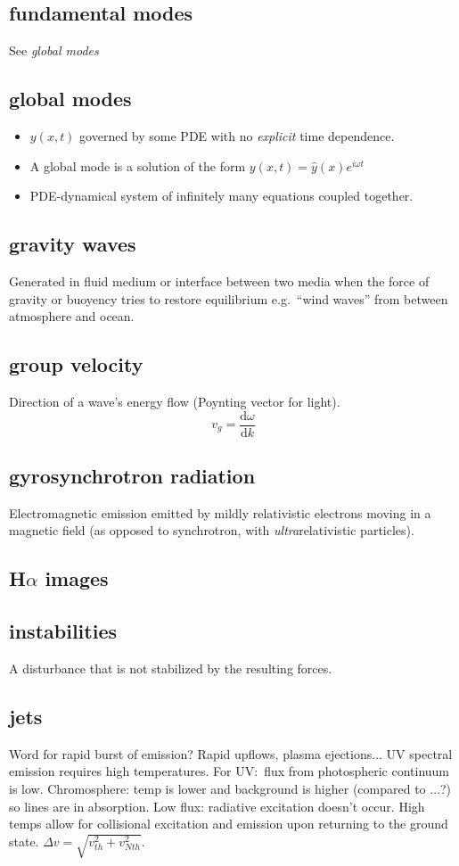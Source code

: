 \documentclass{article}
\begin{document}
\subsection{fundamental modes}
See \emph{global modes}

\subsection{global modes}
\begin{itemize}
    \item $y(x,t)$ governed by some PDE with no \emph{explicit} time dependence.
    \item A global mode is a solution of the form
        $y(x,t) = \hat{y}(x)e^{i\omega t}$
    \item PDE-dynamical system of infinitely many equations coupled together.
\end{itemize}

\subsection{gravity waves}
Generated in fluid medium or interface between two media when the
force of gravity or buoyency tries to restore equilibrium
e.g.\ ``wind waves'' from between atmosphere and ocean.

\subsection{group velocity}
Direction of a wave's energy flow (Poynting vector for light).
\[
    v_{g} = \frac{ \mathrm{d}\omega }{ \mathrm{d}k }
    \]

\subsection{gyrosynchrotron radiation}
Electromagnetic emission emitted by mildly relativistic electrons moving
in a magnetic field
(as opposed to synchrotron, with \emph{ultra}relativistic particles).
\subsection{H$\alpha$ images}
\subsection{instabilities}
A disturbance that is not stabilized by the resulting forces.

\subsection{jets}
Word for rapid burst of emission? Rapid upflows, plasma
ejections$\ldots$ UV spectral emission requires high temperatures.
For UV:\ flux from photospheric continuum is low. Chromosphere:
temp is lower and background is higher (compared to $\ldots$?)
so lines are in absorption. Low flux: radiative excitation doesn't occur.
High temps allow for collisional excitation and emission upon returning
to the ground state. $\Delta v = \sqrt{v_{th}^2+v_{Nth}^2}$.
\end{document}
